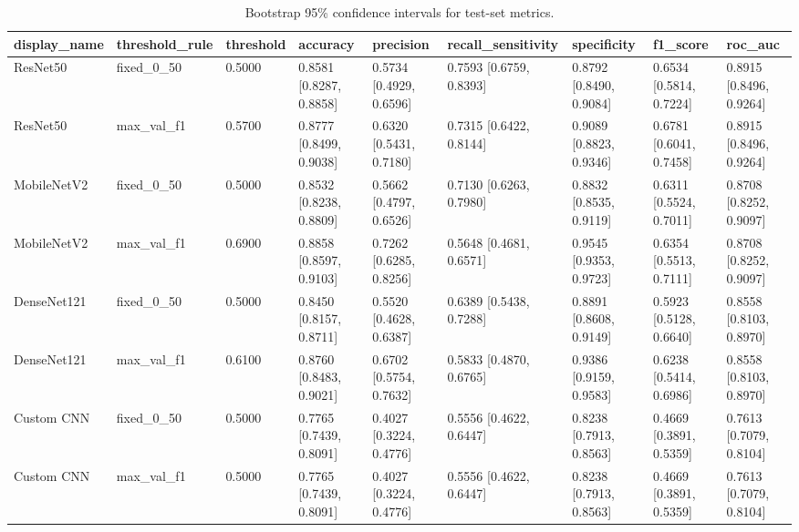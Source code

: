 \begin{table}
\caption{Bootstrap 95\% confidence intervals for test-set metrics.}
\label{tab:bootstrap_ci}
\begin{tabular}{lllllllll}
\toprule
display\_name & threshold\_rule & threshold & accuracy & precision & recall\_sensitivity & specificity & f1\_score & roc\_auc \\
\midrule
ResNet50 & fixed\_0\_50 & 0.5000 & 0.8581 [0.8287, 0.8858] & 0.5734 [0.4929, 0.6596] & 0.7593 [0.6759, 0.8393] & 0.8792 [0.8490, 0.9084] & 0.6534 [0.5814, 0.7224] & 0.8915 [0.8496, 0.9264] \\
ResNet50 & max\_val\_f1 & 0.5700 & 0.8777 [0.8499, 0.9038] & 0.6320 [0.5431, 0.7180] & 0.7315 [0.6422, 0.8144] & 0.9089 [0.8823, 0.9346] & 0.6781 [0.6041, 0.7458] & 0.8915 [0.8496, 0.9264] \\
MobileNetV2 & fixed\_0\_50 & 0.5000 & 0.8532 [0.8238, 0.8809] & 0.5662 [0.4797, 0.6526] & 0.7130 [0.6263, 0.7980] & 0.8832 [0.8535, 0.9119] & 0.6311 [0.5524, 0.7011] & 0.8708 [0.8252, 0.9097] \\
MobileNetV2 & max\_val\_f1 & 0.6900 & 0.8858 [0.8597, 0.9103] & 0.7262 [0.6285, 0.8256] & 0.5648 [0.4681, 0.6571] & 0.9545 [0.9353, 0.9723] & 0.6354 [0.5513, 0.7111] & 0.8708 [0.8252, 0.9097] \\
DenseNet121 & fixed\_0\_50 & 0.5000 & 0.8450 [0.8157, 0.8711] & 0.5520 [0.4628, 0.6387] & 0.6389 [0.5438, 0.7288] & 0.8891 [0.8608, 0.9149] & 0.5923 [0.5128, 0.6640] & 0.8558 [0.8103, 0.8970] \\
DenseNet121 & max\_val\_f1 & 0.6100 & 0.8760 [0.8483, 0.9021] & 0.6702 [0.5754, 0.7632] & 0.5833 [0.4870, 0.6765] & 0.9386 [0.9159, 0.9583] & 0.6238 [0.5414, 0.6986] & 0.8558 [0.8103, 0.8970] \\
Custom CNN & fixed\_0\_50 & 0.5000 & 0.7765 [0.7439, 0.8091] & 0.4027 [0.3224, 0.4776] & 0.5556 [0.4622, 0.6447] & 0.8238 [0.7913, 0.8563] & 0.4669 [0.3891, 0.5359] & 0.7613 [0.7079, 0.8104] \\
Custom CNN & max\_val\_f1 & 0.5000 & 0.7765 [0.7439, 0.8091] & 0.4027 [0.3224, 0.4776] & 0.5556 [0.4622, 0.6447] & 0.8238 [0.7913, 0.8563] & 0.4669 [0.3891, 0.5359] & 0.7613 [0.7079, 0.8104] \\
\bottomrule
\end{tabular}
\end{table}
